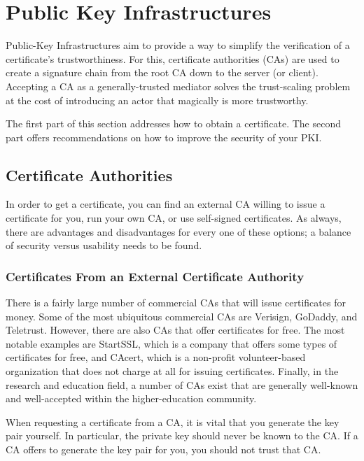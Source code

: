 \section{Public Key Infrastructures}
\label{section:PKIs}

Public-Key Infrastructures aim to provide a way to simplify the verification of
a certificate's trustworthiness.  For this, certificate authorities (CAs) are
used to create a signature chain from the root CA down to the server (or client).
Accepting a CA as a generally-trusted mediator solves the trust-scaling problem
at the cost of introducing an actor that magically is more trustworthy.

The first part of this section addresses how to obtain a certificate.  The
second part offers recommendations on how to improve the security of your
PKI.

\subsection{Certificate Authorities}
\label{sec:cas}
In order to get a certificate, you can find an external CA willing to issue
a certificate for you, run your own CA, or use self-signed certificates.
As always, there are advantages and disadvantages for every one of these
options; a balance of security versus usability needs to be found.

\subsubsection{Certificates From an External Certificate Authority}
\label{sec:signcertfromca}

There is a fairly large number of commercial CAs that will issue
certificates for money.  Some of the most ubiquitous commercial CAs are
Verisign, GoDaddy, and Teletrust.  However, there are also CAs that offer
certificates for free.  The most notable examples are StartSSL, which is a
company that offers some types of certificates for free, and CAcert, which
is a non-profit volunteer-based organization that does not charge at all
for issuing certificates.  Finally, in the research and education field, a
number of CAs exist that are generally well-known and well-accepted within
the higher-education community.

When requesting a certificate from a CA, it is vital that you generate the
key pair yourself.  In particular, the private key should never be known to
the CA.  If a CA offers to generate the key pair for you, you should not
trust that CA.

